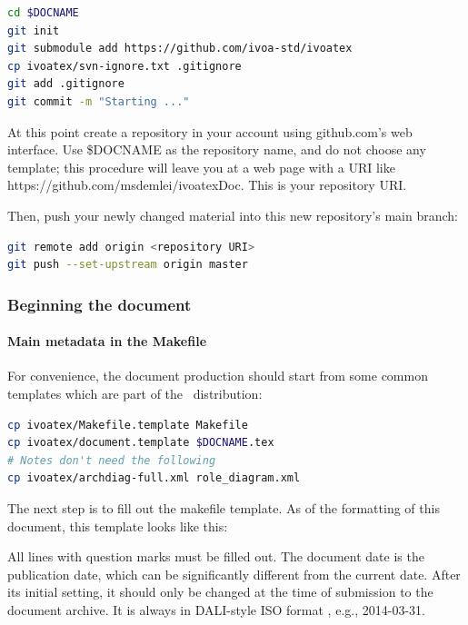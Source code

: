 \documentclass[11pt,a4paper]{ivoa}
\begin{document}
\begin{lstlisting}[language=sh,basicstyle=\footnotesize]
cd $DOCNAME
git init
git submodule add https://github.com/ivoa-std/ivoatex
cp ivoatex/svn-ignore.txt .gitignore
git add .gitignore
git commit -m "Starting ..."
\end{lstlisting}

At this point create a repository in your account using github.com's web
interface. Use \$DOCNAME as the repository name, and do not choose any
template; this procedure will leave you at a web page with a URI like
https://github.com/msdemlei/ivoatexDoc.  This is your repository URI.

Then, push your newly changed material into this new repository's main
branch:

\begin{lstlisting}[language=sh,basicstyle=\footnotesize]
git remote add origin <repository URI>
git push --set-upstream origin master
\end{lstlisting}

\subsubsection{Beginning the document}
\label{sect:beginning}

\paragraph{Main metadata in the Makefile}

For convenience, the document production should start from some common
templates which are part of the \ivoatex\ distribution:

\begin{lstlisting}[language=sh]
cp ivoatex/Makefile.template Makefile
cp ivoatex/document.template $DOCNAME.tex
# Notes don't need the following
cp ivoatex/archdiag-full.xml role_diagram.xml 
\end{lstlisting}

The next step is to fill out the makefile template.  
As of the formatting of this document, this template looks like this:



All lines with question marks must be filled out.  The document date
is the publication date, which can be significantly different from the
current date.  After its initial setting, it should only be changed at
the time of submission to the document archive.  It is always in
DALI-style ISO format \citep{2017ivoa.spec.0517D}, e.g., 2014-03-31.
\end{document}

